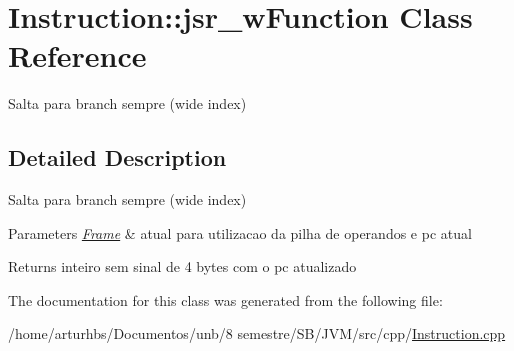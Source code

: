 \hypertarget{classInstruction_1_1jsr__wFunction}{}\section{Instruction\+:\+:jsr\+\_\+w\+Function Class Reference}
\label{classInstruction_1_1jsr__wFunction}


Salta para branch sempre (wide index)  




\subsection{Detailed Description}
Salta para branch sempre (wide index) 


\begin{DoxyParams}{Parameters}
{\em \hyperlink{classFrame}{Frame}} & atual para utilizacao da pilha de operandos e pc atual \\
\hline
\end{DoxyParams}
\begin{DoxyReturn}{Returns}
inteiro sem sinal de 4 bytes com o pc atualizado 
\end{DoxyReturn}


The documentation for this class was generated from the following file\+:\begin{DoxyCompactItemize}
\item 
/home/arturhbs/\+Documentos/unb/8 semestre/\+S\+B/\+J\+V\+M/src/cpp/\hyperlink{Instruction_8cpp}{Instruction.\+cpp}\end{DoxyCompactItemize}
